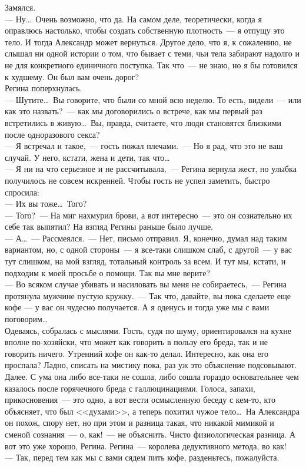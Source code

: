 Замялся.\\

\noindent --- Ну\ldots\ Очень возможно, что да. На самом деле, теоретически, 
когда я оправлюсь 
настолько, чтобы создать собственную плотность~--- я отпущу это тело. И тогда 
Александр может вернуться. Другое дело, что я, к сожалению, не слышал ни одной 
истории о том, что бывает с теми, чьи тела забирают надолго и не для 
конкретного 
единичного поступка. Так что~--- не знаю, но я бы готовился к худшему. Он был 
вам 
очень дорог?\\

Регина поперхнулась.\\

\noindent --- Шутите\ldots\ Вы говорите, что были со мной всю неделю. То есть, 
видели~--- или как 
это назвать?~--- как мы договорились о встрече, как мы первый раз встретились в 
живую\ldots\ Вы, правда, считаете, что люди становятся близкими после 
одноразового 
секса?\\
--- Я встречал и такое,~--- гость пожал плечами.~--- Но я рад, что это не ваш 
случай. 
У него, кстати, жена и дети, так что\ldots\\
--- Я ни на что серьезное и не рассчитывала,~--- Регина вернула жест, но улыбка 
получилось не совсем искренней. Чтобы гость не успел заметить, быстро спросила: 
\\
--- Их вы тоже\ldots\ Того?\\
--- Того?~--- На миг нахмурил брови, а вот интересно~--- это он сознательно их 
себе 
так выпятил? На взгляд Регины раньше было лучше.\\
--- А\ldots~--- Рассмеялся.~--- Нет, письмо отправил. Я, конечно, думал над 
таким 
вариантом, но, с одной стороны~--- я все-таки слишком слаб, с другой~--- у вас 
тут 
слишком, на мой взгляд, тотальный контроль за всем. И тут мы, кстати, и 
подходим 
к моей просьбе о помощи. Так вы мне верите?\\
--- Во всяком случае убивать и насиловать вы меня не собираетесь,~--- Регина 
протянула мужчине пустую кружку.~--- Так что, давайте, вы пока сделаете еще 
кофе --- 
у вас он чудесно получается. А я оденусь и тогда уже мы с вами поговорим\ldots\\

Одеваясь, собралась с мыслями. Гость, судя по шуму, ориентировался на кухне 
вполне по-хозяйски, что может как говорить в пользу его бреда, так и не 
говорить 
ничего. Утренний кофе он как-то делал. Интересно, как она его проспала? Ладно, 
списать на мистику пока, раз уж это объяснение подсовывают. Далее. С ума она 
либо все-таки не сошла, либо сошла гораздо основательнее чем казалось после 
горячечного бреда с галлюцинациями. Голоса, запахи, прикосновения~--- это одно, 
а 
вот вести осмысленную беседу с кем-то, кто объясняет, что был <<духами>>, а 
теперь 
похитил чужое тело\ldots\ На Александра он похож, спору нет, но при этом и 
разница 
такая, что никакой мимикой и сменой сознания~--- о, как!~--- не объяснить. 
Чисто 
физиологическая разница. А вот это уже хорошо, Регина. Регина~--- королева 
дедуктивного метода, во как!\\
--- Так, перед тем как мы с вами сядем пить кофе, разденьтесь, пожалуйста.

